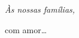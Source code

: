 \null
\vfill

{\normalsize \it \hfill Às nossas famílias, \vspace*{4pt}





\hfill com amor\dots}

